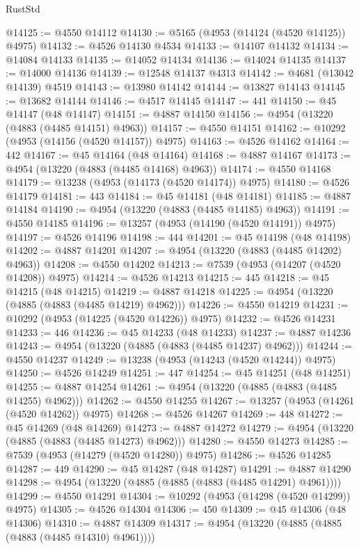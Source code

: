 \begin{lexlean}{RustStd}
\begin{coremodule}
@14125 := @4550 @14112
@14130 := @5165 (@4953 (@14124 (@4520 @14125)) @4975)
@14132 := @4526 @14130 @4534
@14133 := @14107 @14132
@14134 := @14084 @14133
@14135 := @14052 @14134
@14136 := @14024 @14135
@14137 := @14000 @14136
@14139 := @12548 @14137 @4313
@14142 := @4681 (@13042 @14139) @4519
@14143 := @13980 @14142
@14144 := @13827 @14143
@14145 := @13682 @14144
@14146 := @4517 @14145
@14147 := 441
@14150 := @45 @14147 (@48 @14147)
@14151 := @4887 @14150
@14156 := @4954 (@13220 (@4883 (@4485 @14151) @4963))
@14157 := @4550 @14151
@14162 := @10292 (@4953 (@14156 (@4520 @14157)) @4975)
@14163 := @4526 @14162
@14164 := 442
@14167 := @45 @14164 (@48 @14164)
@14168 := @4887 @14167
@14173 := @4954 (@13220 (@4883 (@4485 @14168) @4963))
@14174 := @4550 @14168
@14179 := @13238 (@4953 (@14173 (@4520 @14174)) @4975)
@14180 := @4526 @14179
@14181 := 443
@14184 := @45 @14181 (@48 @14181)
@14185 := @4887 @14184
@14190 := @4954 (@13220 (@4883 (@4485 @14185) @4963))
@14191 := @4550 @14185
@14196 := @13257 (@4953 (@14190 (@4520 @14191)) @4975)
@14197 := @4526 @14196
@14198 := 444
@14201 := @45 @14198 (@48 @14198)
@14202 := @4887 @14201
@14207 := @4954 (@13220 (@4883 (@4485 @14202) @4963))
@14208 := @4550 @14202
@14213 := @7539 (@4953 (@14207 (@4520 @14208)) @4975)
@14214 := @4526 @14213
@14215 := 445
@14218 := @45 @14215 (@48 @14215)
@14219 := @4887 @14218
@14225 := @4954 (@13220 (@4885 (@4883 (@4485 @14219) @4962)))
@14226 := @4550 @14219
@14231 := @10292 (@4953 (@14225 (@4520 @14226)) @4975)
@14232 := @4526 @14231
@14233 := 446
@14236 := @45 @14233 (@48 @14233)
@14237 := @4887 @14236
@14243 := @4954 (@13220 (@4885 (@4883 (@4485 @14237) @4962)))
@14244 := @4550 @14237
@14249 := @13238 (@4953 (@14243 (@4520 @14244)) @4975)
@14250 := @4526 @14249
@14251 := 447
@14254 := @45 @14251 (@48 @14251)
@14255 := @4887 @14254
@14261 := @4954 (@13220 (@4885 (@4883 (@4485 @14255) @4962)))
@14262 := @4550 @14255
@14267 := @13257 (@4953 (@14261 (@4520 @14262)) @4975)
@14268 := @4526 @14267
@14269 := 448
@14272 := @45 @14269 (@48 @14269)
@14273 := @4887 @14272
@14279 := @4954 (@13220 (@4885 (@4883 (@4485 @14273) @4962)))
@14280 := @4550 @14273
@14285 := @7539 (@4953 (@14279 (@4520 @14280)) @4975)
@14286 := @4526 @14285
@14287 := 449
@14290 := @45 @14287 (@48 @14287)
@14291 := @4887 @14290
@14298 := @4954 (@13220 (@4885 (@4885 (@4883 (@4485 @14291) @4961))))
@14299 := @4550 @14291
@14304 := @10292 (@4953 (@14298 (@4520 @14299)) @4975)
@14305 := @4526 @14304
@14306 := 450
@14309 := @45 @14306 (@48 @14306)
@14310 := @4887 @14309
@14317 := @4954 (@13220 (@4885 (@4885 (@4883 (@4485 @14310) @4961))))

\end{coremodule}
\end{lexlean}
